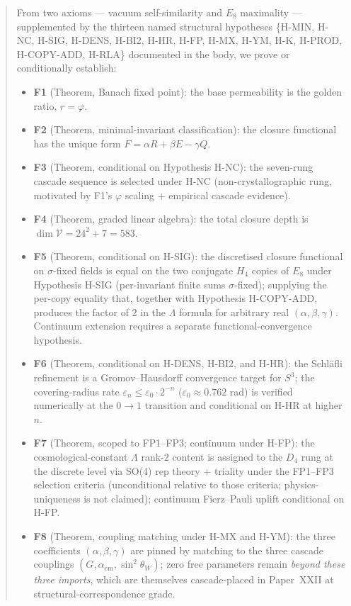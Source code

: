 \documentclass[12pt]{article}
\theoremstyle{definition}
\theoremstyle{remark}
\newcommand{\Vcal}{\mathcal{V}}
\begin{document}
\begin{abstract}
From two axioms --- vacuum self-similarity and $E_8$ maximality --- supplemented by the thirteen named structural hypotheses \{H-MIN, H-NC, H-SIG, H-DENS, H-BI2, H-HR, H-FP, H-MX, H-YM, H-K, H-PROD, H-COPY-ADD, H-RLA\} documented in the body, we prove or conditionally establish:
\begin{itemize}
\item \textbf{F1} (Theorem, Banach fixed point): the base permeability is the golden ratio, $r = \varphi$.
\item \textbf{F2} (Theorem, minimal-invariant classification): the closure functional has the unique form $F = \alpha R + \beta E - \gamma Q$.
\item \textbf{F3} (Theorem, conditional on Hypothesis H-NC): the seven-rung cascade sequence is selected under H-NC (non-crystallographic rung, motivated by F1's $\varphi$ scaling + empirical cascade evidence).
\item \textbf{F4} (Theorem, graded linear algebra): the total closure depth is $\dim \Vcal = 24^2 + 7 = 583$.
\item \textbf{F5} (Theorem, conditional on H-SIG): the discretised closure functional on $\sigma$-fixed fields is equal on the two conjugate $H_4$ copies of $E_8$ under Hypothesis H-SIG (per-invariant finite sums $\sigma$-fixed); supplying the per-copy equality that, together with Hypothesis H-COPY-ADD, produces the factor of 2 in the $\Lambda$ formula for arbitrary real $(\alpha, \beta, \gamma)$. Continuum extension requires a separate functional-convergence hypothesis.
\item \textbf{F6} (Theorem, conditional on H-DENS, H-BI2, and H-HR): the Schl\"afli refinement is a Gromov--Hausdorff convergence target for $S^3$; the covering-radius rate $\varepsilon_n \le \varepsilon_0 \cdot 2^{-n}$ ($\varepsilon_0 \approx 0.762$ rad) is verified numerically at the $0 \to 1$ transition and conditional on H-HR at higher $n$.
\item \textbf{F7} (Theorem, scoped to FP1--FP3; continuum under H-FP): the cosmological-constant $\Lambda$ rank-$2$ content is assigned to the $D_4$ rung at the discrete level via SO(4) rep theory + triality under the FP1--FP3 selection criteria (unconditional relative to those criteria; physics-uniqueness is not claimed); continuum Fierz--Pauli uplift conditional on H-FP.
\item \textbf{F8} (Theorem, coupling matching under H-MX and H-YM): the three coefficients $(\alpha, \beta, \gamma)$ are pinned by matching to the three cascade couplings $(G, \alpha_{\mathrm{em}}, \sin^2\theta_W)$; zero free parameters remain \emph{beyond these three imports}, which are themselves cascade-placed in Paper~XXII at structural-correspondence grade.

\end{itemize}
\end{abstract}
\end{document}
